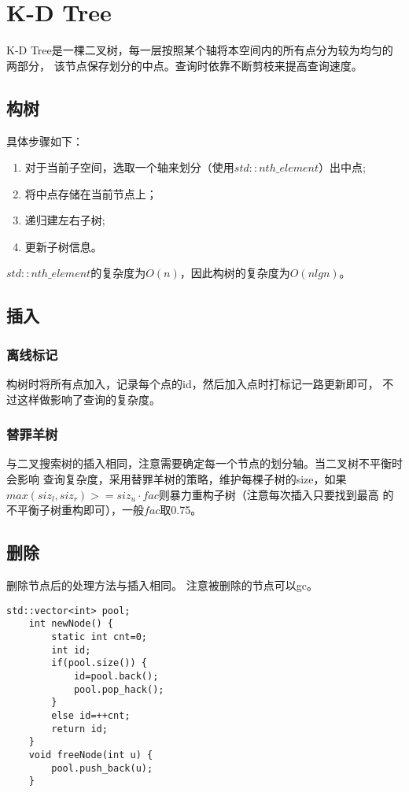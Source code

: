 \section{K-D Tree}
K-D Tree是一棵二叉树，每一层按照某个轴将本空间内的所有点分为较为均匀的两部分，
该节点保存划分的中点。查询时依靠不断剪枝来提高查询速度。
\subsection{构树}
具体步骤如下：
\begin{enumerate}
	\item 对于当前子空间，选取一个轴来划分（使用$std::nth\_element$）出中点;
	\item 将中点存储在当前节点上；
	\item 递归建左右子树;
	\item 更新子树信息。
\end{enumerate}
$std::nth\_element$的复杂度为$O(n)$，因此构树的复杂度为$O(nlgn)$。
\subsection{插入}
\subsubsection{离线标记}
构树时将所有点加入，记录每个点的id，然后加入点时打标记一路更新即可，
不过这样做影响了查询的复杂度。
\subsubsection{替罪羊树}
与二叉搜索树的插入相同，注意需要确定每一个节点的划分轴。当二叉树不平衡时会影响
查询复杂度，采用替罪羊树的策略，维护每棵子树的size，如果
$max(siz_l,siz_r)>=siz_u \cdot fac$则暴力重构子树（注意每次插入只要找到最高
的不平衡子树重构即可），一般$fac$取0.75。
\subsection{删除}
删除节点后的处理方法与插入相同。
注意被删除的节点可以gc。

\begin{lstlisting}[title=gc]
    std::vector<int> pool;
    int newNode() {
        static int cnt=0;
        int id;
        if(pool.size()) {
            id=pool.back();
            pool.pop_hack();
        }
        else id=++cnt;
        return id;
    }
    void freeNode(int u) {
        pool.push_back(u);
    }
\end{lstlisting}


